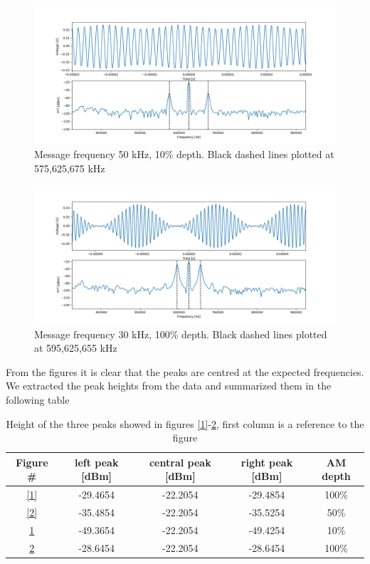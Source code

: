 \documentclass[a4paper,10pt]{article}
\begin{document}
\begin{figure}[H]
\centering
\includegraphics[width=\textwidth]{amp3}
\caption{Message frequency 50 kHz, 10\% depth. Black dashed lines plotted at 575,625,675 kHz}\label{3}
\end{figure}
\begin{figure}[H]
\centering
\includegraphics[width=\textwidth]{amp4}
\caption{Message frequency 30 kHz, 100\% depth. Black dashed lines plotted at 595,625,655 kHz}\label{4}
\end{figure}
From the figures it is clear that the peaks are centred at the expected frequencies. We extracted the peak heights from the data and summarized them in the following table
\begin{table}[H]
\centering
\begin{tabular}{c|c|c|c|c}
 Figure \# & left peak [dBm] & central peak [dBm]& right peak [dBm]& AM depth\\
  \hline
  \ref{1} & -29.4654 & -22.2054 & -29.4854 & 100\%\\
  \hline
  \ref{2} & -35.4854 & -22.2054 & -35.5254 & 50\%\\
  \hline
  \ref{3} & -49.3654 & -22.2054 & -49.4254 & 10\%\\
  \hline
  \ref{4} & -28.6454 & -22.2054 & -28.6454 & 100\%\\
  \hline
\end{tabular}
\caption{Height of the three peaks showed in figures \ref{1}-\ref{4}, first column is a reference to the figure}
\end{table}
\end{document}
